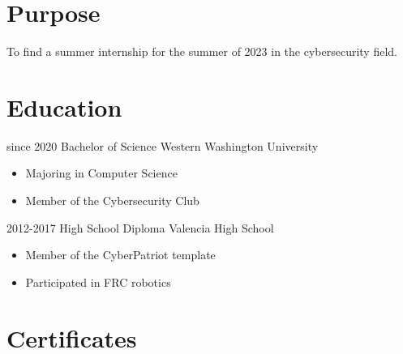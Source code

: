 \documentclass[letterpaper]{twentysecondcv} %
\begin{document}
\makeprofile %


\section{Purpose}

To find a summer internship for the summer of 2023 in the cybersecurity field.


\section{Education}

\begin{twenty} %
	\twentyitem
		{since 2020}
		{Bachelor of Science}
		{Western Washington University}
		{\begin{itemize}
			\item Majoring in Computer Science
			\item Member of the Cybersecurity Club
		\end{itemize}}
	\twentyitem
		{2012-2017}
		{High School Diploma}
		{Valencia High School}
		{\begin{itemize}
			\item Member of the CyberPatriot template
			\item Participated in FRC robotics
		\end{itemize}}
\end{twenty}


\section{Certificates}

\begin{twentyshort} %
\end{twentyshort}
\end{document}

